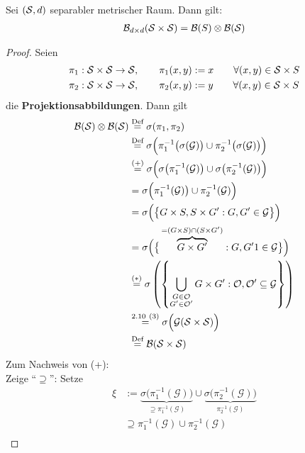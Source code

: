 \begin{satz} %
Sei $(\S,d)$ separabler metrischer Raum. Dann gilt:
\begin{align*}
\B_{d\times d}(\S\times\S)=\B(S)\otimes\B(\S)
\end{align*}
\end{satz}
\begin{proof}
Seien
\begin{align*}
&\pi_1:\S\times\S\to\S,\qquad \pi_1(x,y):=x\qquad\forall(x,y)\in\S\times S\\
&\pi_2:\S\times\S\to\S,\qquad \pi_2(x,y):=y\qquad\forall(x,y)\in\S\times S
\end{align*}
die \textbf{Projektionsabbildungen}. Dann gilt
\begin{align*}
\B(\S)\otimes\B(\S) 
&\stackeq{\text{Def}}
\sigma(\pi_1,\pi_2)\\
&\stackeq{\text{Def}}
\sigma\Big(\pi_1^{-1}\big(\sigma(\mathcal{G})\big)\cup\pi_2^{-1}\big(\sigma(\mathcal{G})\big)\Big)\\
&\stackeq{(+)}
\sigma\Big(\sigma\big(\pi_1^{-1}(\mathcal{G})\big)\cup\sigma\big(\pi_2^{-1}(\mathcal{G})\big)\Big)\\
&=
\sigma\Big(\pi_1^{-1}(\mathcal{G})\big)\cup\pi_2^{-1}(\mathcal{G})\Big)\\
&=\sigma\Big(\big\lbrace G\times S,S\times G':G,G'\in\mathcal{G}\big\rbrace\Big)\\
&=
\sigma\Big(\big\lbrace \overbrace{G\times G'}^{=(G\times S)\cap(S\times G')}:G,G'1\in\mathcal{G}\big\rbrace\Big)\\
&\stackeq{\text{($\ast$)}}
\sigma\left(\left\lbrace\bigcup\limits_{\begin{subarray}{c}G\in\mathcal{O}\\G'\in\mathcal{O}'\end{subarray}}G\times G':\mathcal{O},\mathcal{O}'\subseteq\mathcal{G}\right\rbrace\right)\\
&\stackeq{2.10~(3)}
\sigma\Big(\mathcal{G}(\S\times\S)\Big)\\
&\stackeq{\text{Def}}
\B(\S\times\S)
\end{align*}
Zum Nachweis von (+):\\
Zeige ``$\supseteq$'': Setze
\begin{align*}
\xi&:=
\underbrace{\sigma\big(\pi_1^{-1}(\mathcal{G})\big)}_{\supseteq \pi_1^{-1}(\mathcal{G})}\cup\underbrace{\sigma\big(\pi_2^{-1}(\mathcal{G})\big)}_{\pi_2^{-1}(\mathcal{G})}\\
&\supseteq
\pi_1^{-1}(\mathcal{G})\cup\pi_2^{-1}(\mathcal{G})\\

\end{align*}
\end{proof}
